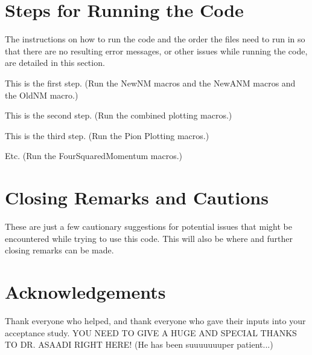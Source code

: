 \documentclass[11pt]{article}
\begin{document}
\section{Steps for Running the Code}
The instructions on how to run the code and the order the files need to run in so that there are no resulting error messages, or other issues while running the code, are detailed in this section.

\begin{adjustwidth}{4.0em}{0pt}
\begin{steps}
  \item This is the first step. (Run the NewNM macros and the NewANM macros and the OldNM macro.)
  \item This is the second step. (Run the combined plotting macros.)
  \item This is the third step. (Run the Pion Plotting macros.)
  \item Etc. (Run the FourSquaredMomentum macros.)
\end{steps}
\end{adjustwidth}



\section{Closing Remarks and Cautions}
These are just a few cautionary suggestions for potential issues that might be encountered while trying to use this code. This will also be where and further closing remarks can be made.



\section{Acknowledgements}
Thank everyone who helped, and thank everyone who gave their inputs into your acceptance study. YOU NEED TO GIVE A HUGE AND SPECIAL THANKS TO DR. ASAADI RIGHT HERE! (He has been suuuuuuuper patient...)
\end{document}
